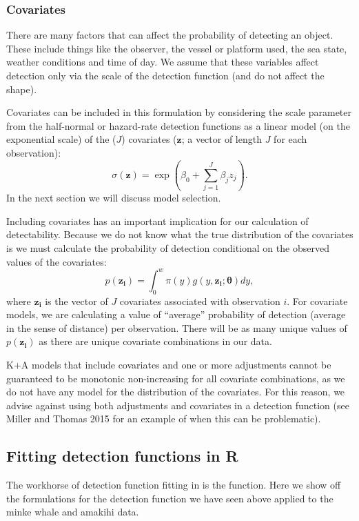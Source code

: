 \documentclass[article]{jss}
\begin{document}
\subsubsection{Covariates}\label{covariates}

There are many factors that can affect the probability of detecting an
object. These include things like the observer, the vessel or platform
used, the sea state, weather conditions and time of day. We assume that
these variables affect detection only via the scale of the detection
function (and do not affect the shape).

Covariates can be included in this formulation by considering the scale
parameter from the half-normal or hazard-rate detection functions as a
linear model (on the exponential scale) of the (\(J\)) covariates
(\(\mathbf{z}\); a vector of length \(J\) for each observation): \[
\sigma(\mathbf{z}) = \exp(\beta_0 + \sum_{j=1}^J \beta_j z_j).
\] In the next section we will discuss model selection.

Including covariates has an important implication for our calculation of
detectability. Because we do not know what the true distribution of the
covariates is we must calculate the probability of detection conditional
on the observed values of the covariates: \[
p(\mathbf{z_i}) = \int_0^w \pi(y) g(y, \mathbf{z_i}; \boldsymbol{\theta}) dy,
\] where \(\mathbf{z_i}\) is the vector of \(J\) covariates associated
with observation \(i\). For covariate models, we are calculating a value
of ``average'' probability of detection (average in the sense of
distance) per observation. There will be as many unique values of
\(p(\mathbf{z_i})\) as there are unique covariate combinations in our
data.

K+A models that include covariates and one or more adjustments cannot be
guaranteed to be monotonic non-increasing for all covariate
combinations, as we do not have any model for the distribution of the
covariates. For this reason, we advise against using both adjustments
and covariates in a detection function (see Miller and Thomas 2015 for
an example of when this can be problematic).

\subsection{Fitting detection functions in
R}\label{fitting-detection-functions-in-r}

The workhorse of detection function fitting in  is the
 function. Here we show off the formulations for the detection
function we have seen above applied to the minke whale and amakihi data.
\end{document}
